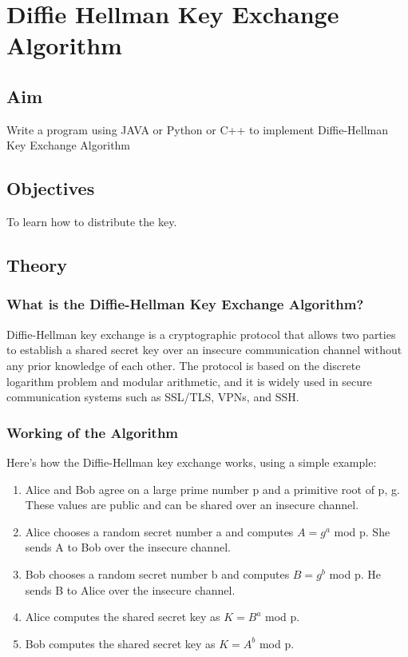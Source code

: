 \documentclass[openany]{book}
\begin{document}
\chapter{Diffie Hellman Key Exchange Algorithm}
\section{Aim}
Write a program using JAVA or Python or C++ to implement Diffie-Hellman Key Exchange Algorithm

\section{Objectives}
To learn how to distribute the key.

\section{Theory}

\subsection{What is the Diffie-Hellman Key Exchange Algorithm?}

Diffie-Hellman key exchange is a cryptographic protocol that allows two parties to establish a shared secret key over an insecure communication channel without any prior knowledge of each other. The protocol is based on the discrete logarithm problem and modular arithmetic, and it is widely used in secure communication systems such as SSL/TLS, VPNs, and SSH.

\subsection{Working of the Algorithm}

Here's how the Diffie-Hellman key exchange works, using a simple example:

\begin{enumerate}
    \item Alice and Bob agree on a large prime number p and a primitive root of p, g. These values are public and can be shared over an insecure channel.
    \item Alice chooses a random secret number a and computes $ A = g^a $ mod p. She sends A to Bob over the insecure channel.
    \item Bob chooses a random secret number b and computes $B = g^b$ mod p. He sends B to Alice over the insecure channel.
    \item Alice computes the shared secret key as $K = B^a$ mod p.
    \item Bob computes the shared secret key as $K = A^b$ mod p.
\end{enumerate}
\end{document}
